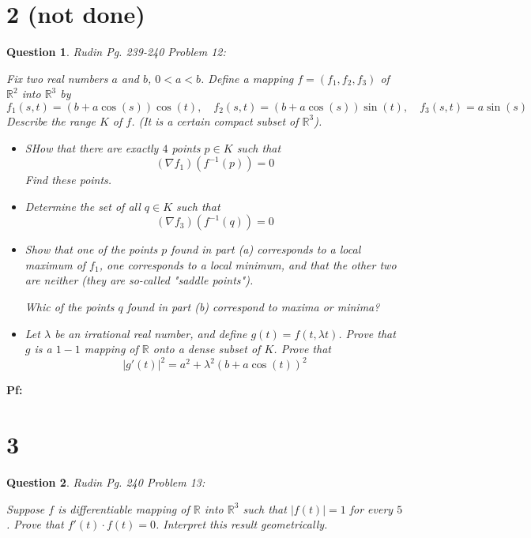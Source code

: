 \documentclass{article}
\newtheorem{question}{Question}
\begin{document}
\section*{2 (not done)}
\begin{myBox}[]{}
    \begin{question}
        Rudin Pg. 239-240 Problem 12:

        Fix two real numbers $a$ and $b$, $0<a<b$. Define a mapping $f=(f_1,f_2,f_3)$ of $\mathbb{R}^2$ into $\mathbb{R}^3$ by 
        $$f_1(s,t)=(b+a\cos(s))\cos(t),\quad f_2(s,t)=(b+a\cos(s))\sin(t),\quad f_3(s,t)=a\sin(s)$$
        Describe the range $K$ of $f$. (It is a certain compact subset of $\mathbb{R}^3$).

        \begin{itemize}
            \item[(a)] SHow that there are exactly $4$ points $p\in K$ such that 
            $$(\nabla f_1)(f^{-1}(p))=0$$
            Find these points.
            \item[(b)] Determine the set of all $q\in K$ such that 
            $$(\nabla f_3)(f^{-1}(q))=0$$
            \item[(c)] Show that one of the points $p$ found in part (a) corresponds to a local maximum of $f_1$, one corresponds to a local minimum, and that the other two are neither (they are so-called "saddle points").
            
            Whic of the points $q$ found in part (b) correspond to maxima or minima?
            \item[(d)] Let $\lambda$ be an irrational real number, and define $g(t)=f(t,\lambda t)$. Prove that $g$ is a $1-1$ mapping of $\mathbb{R}$ onto a dense subset of $K$. Prove that
            $$|g'(t)|^2 = a^2+\lambda^2(b+a\cos(t))^2$$
        \end{itemize}
    \end{question}
\end{myBox}

\textbf{Pf:}

\break

\section*{3}
\begin{myBox}[]{}
    \begin{question}
        Rudin Pg. 240 Problem 13:

        Suppose $f$ is differentiable mapping of $\mathbb{R}$ into $\mathbb{R}^3$ such that $|f(t)|=1$ for every $5$.
        Prove that $f'(t)\cdot f(t)=0$. Interpret this result geometrically.
    \end{question}
\end{myBox}
\end{document}
